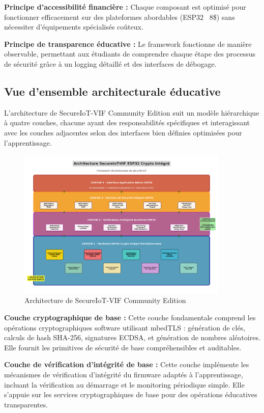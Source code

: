 \textbf{Principe d'accessibilité financière :} Chaque composant est optimisé pour fonctionner efficacement sur des plateformes abordables (ESP32 ~8\$) sans nécessiter d'équipements spécialisés coûteux.

\textbf{Principe de transparence éducative :} Le framework fonctionne de manière observable, permettant aux étudiants de comprendre chaque étape des processus de sécurité grâce à un logging détaillé et des interfaces de débogage.

\subsection{Vue d'ensemble architecturale éducative}

L'architecture de SecureIoT-VIF Community Edition suit un modèle hiérarchique à quatre couches, chacune ayant des responsabilités spécifiques et interagissant avec les couches adjacentes selon des interfaces bien définies optimisées pour l'apprentissage.

\begin{figure}[h]
    \centering
    \includegraphics[width=0.9\textwidth]{assets/figures/secureiot_architecture_esp32.png}
    \caption{Architecture de SecureIoT-VIF Community Edition}
    \label{fig:secureiot-architecture-community}
\end{figure}

\textbf{Couche cryptographique de base :} Cette couche fondamentale comprend les opérations cryptographiques software utilisant mbedTLS : génération de clés, calculs de hash SHA-256, signatures ECDSA, et génération de nombres aléatoires. Elle fournit les primitives de sécurité de base compréhensibles et auditables.

\textbf{Couche de vérification d'intégrité de base :} Cette couche implémente les mécanismes de vérification d'intégrité du firmware adaptés à l'apprentissage, incluant la vérification au démarrage et le monitoring périodique simple. Elle s'appuie sur les services cryptographiques de base pour des opérations éducatives transparentes.


